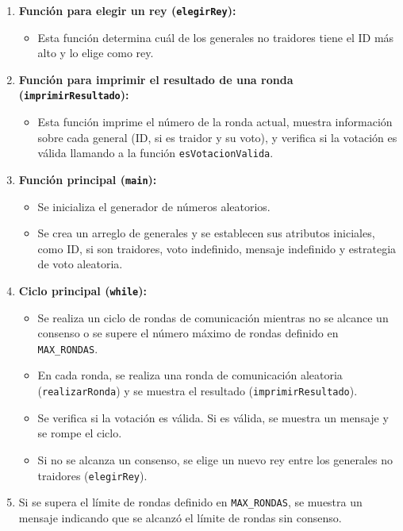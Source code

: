 \documentclass[a4paper,12pt]{article}
\begin{document}
\begin{enumerate}
  \item \textbf{Función para elegir un rey (\texttt{elegirRey}):}
  \begin{itemize}
      \item Esta función determina cuál de los generales no traidores tiene el ID más alto y lo elige como rey.
  \end{itemize}
  
  \item \textbf{Función para imprimir el resultado de una ronda (\texttt{imprimirResultado}):}
  \begin{itemize}
      \item Esta función imprime el número de la ronda actual, muestra información sobre cada general (ID, si es traidor y su voto), y verifica si la votación es válida llamando a la función \texttt{esVotacionValida}.
  \end{itemize}
  
  \item \textbf{Función principal (\texttt{main}):}
  \begin{itemize}
      \item Se inicializa el generador de números aleatorios.
      \item Se crea un arreglo de generales y se establecen sus atributos iniciales, como ID, si son traidores, voto indefinido, mensaje indefinido y estrategia de voto aleatoria.
  \end{itemize}
  
  \item \textbf{Ciclo principal (\texttt{while}):}
  \begin{itemize}
      \item Se realiza un ciclo de rondas de comunicación mientras no se alcance un consenso o se supere el número máximo de rondas definido en \texttt{MAX\_RONDAS}.
      \item En cada ronda, se realiza una ronda de comunicación aleatoria (\texttt{realizarRonda}) y se muestra el resultado (\texttt{imprimirResultado}).
      \item Se verifica si la votación es válida. Si es válida, se muestra un mensaje y se rompe el ciclo.
      \item Si no se alcanza un consenso, se elige un nuevo rey entre los generales no traidores (\texttt{elegirRey}).
  \end{itemize}
  
  \item Si se supera el límite de rondas definido en \texttt{MAX\_RONDAS}, se muestra un mensaje indicando que se alcanzó el límite de rondas sin consenso.
\end{enumerate}
\end{document}
